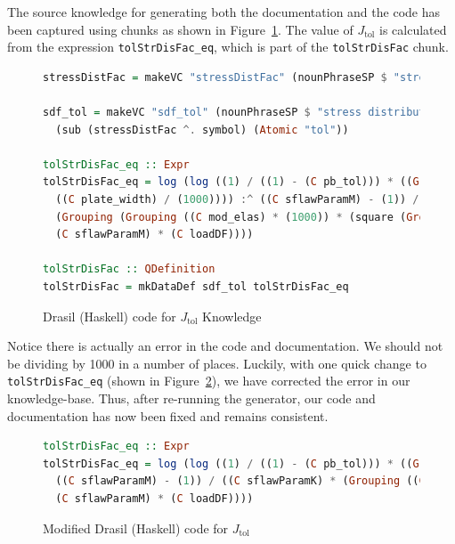 \documentclass[sigconf]{acmart}
\newcommand{\jtol}{$J_{\mbox{tol}}$}
\newcommand{\inlHask}[1]{\lstinline[language=Haskell, frame=single, showstringspaces=false]{#1}}
\begin{document}
The source knowledge for generating both the documentation and the code has been
captured using chunks as shown in Figure~\ref{Fig_JtolDrasil}. The value of 
\jtol{} is calculated from the expression {\inlHask{tolStrDisFac_eq}}, which is 
part of the {\inlHask{tolStrDisFac}} chunk.

\begin{figure}
\begin{lstlisting}[language=Haskell, frame=single, showstringspaces=false, 
basicstyle=\small] 
stressDistFac = makeVC "stressDistFac" (nounPhraseSP $ "stress distribution" ++ " factor (Function)") cJ

sdf_tol = makeVC "sdf_tol" (nounPhraseSP $ "stress distribution" ++ " factor (Function) based on Pbtol") 
  (sub (stressDistFac ^. symbol) (Atomic "tol"))

tolStrDisFac_eq :: Expr
tolStrDisFac_eq = log (log ((1) / ((1) - (C pb_tol))) * ((Grouping (((C plate_len) / (1000)) * 
  ((C plate_width) / (1000)))) :^ ((C sflawParamM) - (1)) / ((C sflawParamK) * 
  (Grouping (Grouping ((C mod_elas) * (1000)) * (square (Grouping ((C act_thick) / (1000)))))) :^ 
  (C sflawParamM) * (C loadDF))))

tolStrDisFac :: QDefinition
tolStrDisFac = mkDataDef sdf_tol tolStrDisFac_eq
\end{lstlisting}
\caption{Drasil (Haskell) code for \jtol{} Knowledge}
\label{Fig_JtolDrasil}
\end{figure}

Notice there is actually an error in the code and documentation. We should not 
be dividing by 1000 in a number of places. Luckily, with one quick change to 
{\inlHask{tolStrDisFac_eq}} (shown in Figure~\ref{Fig_JtolDrasil_fix}), we have 
corrected the error in our knowledge-base. Thus, after re-running the generator,
our code and documentation has now been fixed and remains consistent.

\begin{figure}
\begin{lstlisting}[language=Haskell, frame=single, showstringspaces=false, 
basicstyle=\small]
tolStrDisFac_eq :: Expr
tolStrDisFac_eq = log (log ((1) / ((1) - (C pb_tol))) * ((Grouping ((C plate_len) * (C plate_width))) :^
  ((C sflawParamM) - (1)) / ((C sflawParamK) * (Grouping ((C mod_elas) * (square (C act_thick)))) :^ 
  (C sflawParamM) * (C loadDF))))
\end{lstlisting}
\caption{Modified Drasil (Haskell) code for \jtol{}}
\label{Fig_JtolDrasil_fix}
\end{figure}
\end{document}
